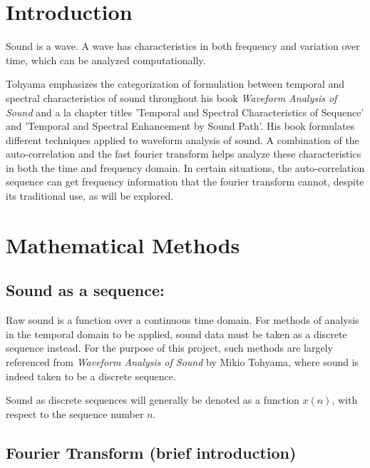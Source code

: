 \documentclass[12pt]{article}
\title{\sf{\textbf{Applying the Fourier Transform and Autocorrelation to Sound}}}
\date{December, 2017}
\author{Adam Gao}
\begin{document}
\maketitle

\section{Introduction}

Sound is a wave. A wave has characteristics in both frequency and variation over time, which can be analyzed computationally.\newline

Tohyama emphasizes the categorization of formulation between temporal and spectral characteristics of sound throughout his book \textit{Waveform Analysis of Sound} and a la chapter titles 'Temporal and Spectral Characteristics of Sequence' and 'Temporal and Spectral Enhancement by Sound Path'.\citep{aa} His book formulates different techniques applied to waveform analysis of sound. A combination of the auto-correlation and the fast fourier transform helps analyze these characteristics in both the time and frequency domain. In certain situations, the auto-correlation sequence can get frequency information that the fourier transform cannot, despite its traditional use, as will be explored.

\section{Mathematical Methods}

\subsection{Sound as a sequence:}

Raw sound is a function over a continuous time domain. For methods of analysis in the temporal domain to be applied, sound data must be taken as a discrete sequence instead.\citep{aa} For the purpose of this project, such methods are largely referenced from \textit{Waveform Analysis of Sound} by Mikio Tohyama, where sound is indeed taken to be a discrete sequence.\citep{aa} \newline

Sound as discrete sequences will generally be denoted as a function $x(n)$, with respect to the sequence number $n$.

\subsection{Fourier Transform (brief introduction)}
\end{document}
